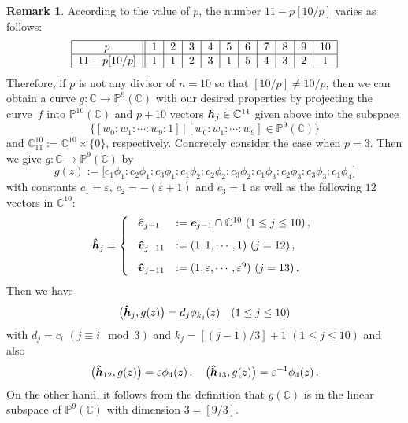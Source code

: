 \documentclass{amsart}
\theoremstyle{definition}
\newtheorem{remark}[theorem]{Remark}
\numberwithin{equation}{section}
\numberwithin{theorem}{section}
\begin{document}
\begin{remark}
According to the value of $p$, the number $11-p[10/p]$ varies as
follows:
\[
\begin{tabular}{|c||c|c|c|c|c|c|c|c|c|c|} \hline
$p$ & 1 & 2 & 3 & 4 & 5 & 6 & 7 & 8 & 9 & 10 \\ \hline
$11-p[10/p]$ & 1 & 1 & 2 & 3 & 1 & 5 & 4 & 3 & 2 & 1 \\ \hline
\end{tabular}
\]
Therefore, if $p$ is not any divisor of $n=10$ so that
$[10/p]\neq 10/p$, then we can obtain a curve
$g:\mathbb{C}\to\mathbb{P}^{9}(\mathbb{C})$ with our desired
properties by projecting the curve~$f$ into
$\mathbb{P}^{10}(\mathbb{C})$ and $p+10$ vectors
$\mbox{\boldmath$h$}_{j}\in\mathbb{C}^{11}$ given above into the
subspace
$$
\bigl\{[w_0:w_1:\cdots:w_9:1]\, |\,
[w_0:w_1:\cdots:w_9]\in\mathbb{P}^{9}(\mathbb{C})\bigr\}
$$
and $\mathbb{C}^{10}_{11}:=\mathbb{C}^{10}\times\{0\}$,
respectively. Concretely consider the case when $p=3$. Then we
give $g:\mathbb{C}\to \mathbb{P}^{9}(\mathbb{C})$ by
$$
g(z):=\bigl[c_1\phi_1:c_2\phi_1:c_3\phi_1:
c_1\phi_2:c_2\phi_2:c_3\phi_2:c_1\phi_3:c_2\phi_3:c_3\phi_3:c_1\phi_4\bigr]
$$
with constants $c_1=\varepsilon$, $c_2=-(\varepsilon+1)$ and $c_3=1$
as well as the following $12$ vectors in
$\mathbb{C}^{10}$:
\[
\mbox{\boldmath$\hat{h}$}_j= \left\{ \
\begin{array}{ll}
\mbox{\boldmath$\hat{e}$}_{j-1} &:=\mbox{\boldmath$e$}_{j-1}\cap \mathbb{C}^{10} \ (1\leq j\leq 10)\,, \\[2ex]
\mbox{\boldmath$\hat{v}$}_{j-11} &:=(1,1,\cdots , 1) \ (j=12) \,, \\[2ex]
\mbox{\boldmath$\hat{v}$}_{j-11} &:=(1,\varepsilon,\cdots , \varepsilon^{9}) \ (j=13)\,.
\end{array}
\right.
\]
Then we have
$$
\bigl(\mbox{\boldmath$\hat{h}$}_{j}, g(z)\bigr)=d_j\phi_{k_j}(z)
\quad (1\leq j\leq 10)
$$
with $d_j=c_i$ $(j\equiv i \mod 3)$ and $k_j=[(j-1)/3]+1$ $(1\leq
j\leq 10)$ and also
$$
\bigl(\mbox{\boldmath$\hat{h}$}_{12},
g(z)\bigr)=\varepsilon \phi_{4}(z)\,, \quad
\bigl(\mbox{\boldmath$\hat{h}$}_{13},
g(z)\bigr)= \varepsilon^{-1} \phi_{4}(z)\,.
$$
On the other hand, it follows from the definition that
$g(\mathbb{C})$ is in the linear subspace of
$\mathbb{P}^{9}(\mathbb{C})$ with dimension $3=[9/3]$.


\end{remark}
\end{document}
